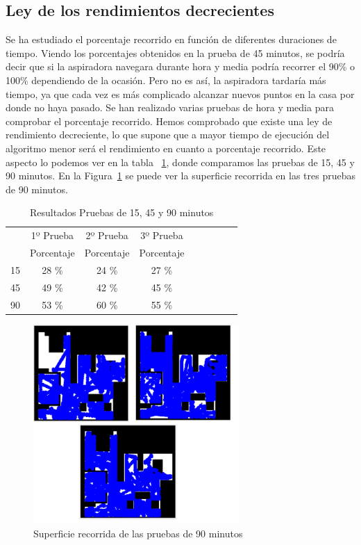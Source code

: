 \subsection{Ley de los rendimientos decrecientes}

Se ha estudiado el porcentaje recorrido en función de diferentes duraciones de tiempo. Viendo los porcentajes obtenidos en la prueba de 45 minutos, se podría decir que si la aspiradora navegara durante hora y media podría recorrer el 90\% o 100\% dependiendo de la ocasión. Pero no es así, la aspiradora tardaría más tiempo, ya que cada vez es más complicado alcanzar nuevos puntos en la casa por donde no haya pasado. Se han realizado varias pruebas de hora y media para comprobar el porcentaje recorrido. Hemos comprobado que existe una ley de rendimiento decreciente, lo que supone que a mayor tiempo de ejecución del algoritmo menor será el rendimiento en cuanto a porcentaje recorrido. Este aspecto lo podemos ver en la tabla ~\ref{resultados_periodos}, donde comparamos las pruebas de 15, 45 y 90 minutos. En la Figura~\ref{fig.Referee_hora} se puede ver la superficie recorrida en las tres pruebas de 90 minutos.\\

\begin{table}[]
\centering
\caption{Resultados Pruebas de 15, 45 y 90 minutos}
\label{resultados_periodos}
\begin{tabular}{c|c|c|c|c|c|c|c|c|}
\cline{2-4}
                          & \multicolumn{1}{c|}{1º Prueba} & \multicolumn{1}{c|}{2º Prueba} & \multicolumn{1}{c|}{3º Prueba} \\ \cline{2-4} 
                         & Porcentaje       & Porcentaje       & Porcentaje     \\ \hline
\multicolumn{1}{|c|}{15} & 28 \%            & 24 \%            & 27 \%          \\ \hline
\multicolumn{1}{|c|}{45} & 49 \%            & 42 \%            & 45 \%          \\ \hline
\multicolumn{1}{|c|}{90} & 53 \%            & 60 \%            & 55 \%          \\ \hline
\end{tabular}
\end{table}

\begin{figure}[H]
  \begin{center}
    \includegraphics[width=0.7\textwidth]{figures/Vacuum/Referee_hora.png}
		\caption{Superficie recorrida de las pruebas de 90 minutos}
		\label{fig.Referee_hora}
		\end{center}
\end{figure}